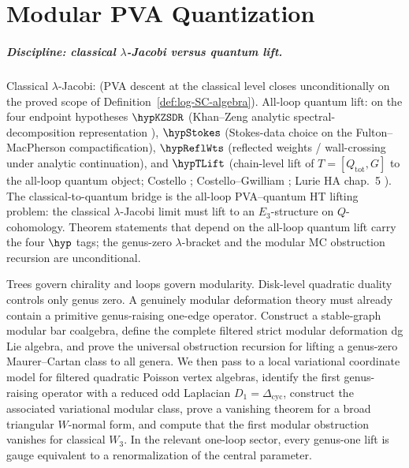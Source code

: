 \chapter{Modular PVA Quantization}
\label{ch:modular-pva-quantization-standalone}

\paragraph{Discipline: classical $\lambda$-Jacobi versus quantum lift.}
Classical $\lambda$-Jacobi: \ClaimStatusProvedHere{} (PVA descent at
the classical level closes unconditionally on the proved scope of
Definition~\ref{def:log-SC-algebra}). All-loop quantum lift:
\ClaimStatusConditional{} on the four endpoint hypotheses
$\hypKZSDR$ (Khan--Zeng analytic spectral-decomposition representation
\cite{KZ25}), $\hypStokes$ (Stokes-data choice on the Fulton--MacPherson
compactification), $\hypReflWts$ (reflected weights / wall-crossing
under analytic continuation), and $\hypTLift$ (chain-level lift of
$T = [Q_{\mathrm{tot}}, G]$ to the all-loop quantum object;
Costello \cite{Costello2011Renorm}; Costello--Gwilliam \cite{CG17};
Lurie HA chap.~5 \cite{LurieHA}). The classical-to-quantum bridge is
the all-loop PVA--quantum HT lifting problem: the classical
$\lambda$-Jacobi limit must lift to an $E_3$-structure on
$Q$-cohomology. Theorem statements that depend on the all-loop quantum
lift carry the four $\hyp$ tags; the genus-zero
$\lambda$-bracket and the modular MC obstruction recursion are
unconditional.

\begin{summary}
Trees govern chirality and loops govern modularity.
Disk-level quadratic duality controls only genus zero. A genuinely modular deformation
theory must already contain a primitive genus-raising one-edge operator. Construct a
stable-graph modular bar coalgebra, define the complete filtered strict modular deformation
dg Lie algebra, and prove the universal obstruction recursion for lifting a genus-zero
Maurer--Cartan class to all genera. We then pass to a local variational coordinate model
for filtered quadratic Poisson vertex algebras, identify the first genus-raising operator
with a reduced odd Laplacian $D_1=\Delta_{\mathrm{cyc}}$, construct the associated
variational modular class, prove a vanishing theorem for a broad triangular $W$-normal form,
and compute that the first modular obstruction vanishes for classical $W_3$.
In the relevant one-loop sector, every genus-one lift is gauge equivalent to a
renormalization of the central parameter.
\end{summary}

